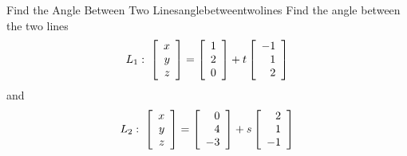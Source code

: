 \begin{example}{Find the Angle Between Two Lines}{anglebetweentwolines}
Find the angle between the two lines
\begin{equation*}
L_1:  \;
\left[
\begin{array}{r}
x \\
y \\
z 
\end{array}
\right]
 = 
\left[
\begin{array}{r}
1 \\
2 \\
0
\end{array}
\right] +t\left[
\begin{array}{r}
-1 \\
1 \\
2
\end{array}
\right] 
\end{equation*}
 and
\begin{equation*}
L_2: \;
\left[
\begin{array}{r}
x \\
y \\
z
\end{array}
\right]
 = 
\left[
\begin{array}{r}
0 \\
4 \\
-3
\end{array}
\right]
 +s\left[
\begin{array}{r}
2 \\
1 \\
-1
\end{array}
\right]
\end{equation*}
\end{example}

